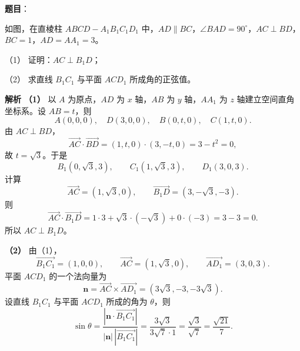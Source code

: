 \begin{answer}

\textbf{题目}：

如图，在直棱柱 $ABCD-A_1B_1C_1D_1$ 中，$AD\parallel BC$，$\angle BAD=90^\circ$，$AC\perp BD$，$BC=1$，$AD=AA_1=3$。

（1） 证明：$AC\perp B_1D$；

（2） 求直线 $B_1C_1$ 与平面 $ACD_1$ 所成角的正弦值。
\nopagebreak[4]
\begin{center}\end{center}
\nopagebreak[4]
\textbf{解析}
\textbf{（1）} 以 $A$ 为原点，$AD$ 为 $x$ 轴，$AB$ 为 $y$ 轴，$AA_1$ 为 $z$ 轴建立空间直角坐标系。设 $AB=t$，则
\nopagebreak[4]
\[A(0,0,0),\quad D(3,0,0),\quad B(0,t,0),\quad C(1,t,0).\]
由 $AC\perp BD$，
\nopagebreak[4]
\[\overrightarrow{AC}\cdot\overrightarrow{BD}=(1,t,0)\cdot(3,-t,0)=3-t^2=0,\]
故 $t=\sqrt3$。于是
\nopagebreak[4]
\[B_1(0,\sqrt3,3),\qquad C_1(1,\sqrt3,3),\qquad D_1(3,0,3).\]
计算
\nopagebreak[4]
\[\overrightarrow{AC}=(1,\sqrt3,0),\qquad
\overrightarrow{B_1D}=(3,-\sqrt3,-3).\]
则
\nopagebreak[4]
\[\overrightarrow{AC}\cdot\overrightarrow{B_1D}
=1\cdot3+\sqrt3\cdot(-\sqrt3)+0\cdot(-3)=3-3=0.\]
所以 $AC\perp B_1D$。

\textbf{（2）} 由（1），
\nopagebreak[4]
\[\overrightarrow{B_1C_1}=(1,0,0),\qquad
\overrightarrow{AC}=(1,\sqrt3,0),\qquad
\overrightarrow{AD_1}=(3,0,3).\]
平面 $ACD_1$ 的一个法向量为
\nopagebreak[4]
\[\boldsymbol n=\overrightarrow{AC}\times\overrightarrow{AD_1}
=(3\sqrt3,-3,-3\sqrt3).\]
设直线 $B_1C_1$ 与平面 $ACD_1$ 所成的角为 $\theta$，则
\nopagebreak[4]
\[\sin\theta=\frac{|\boldsymbol n\cdot\overrightarrow{B_1C_1}|}{|\boldsymbol n|\,|\overrightarrow{B_1C_1}|}
=\frac{3\sqrt3}{3\sqrt7\cdot1}
=\frac{\sqrt3}{\sqrt7}
=\frac{\sqrt{21}}7.\]



\end{answer}
